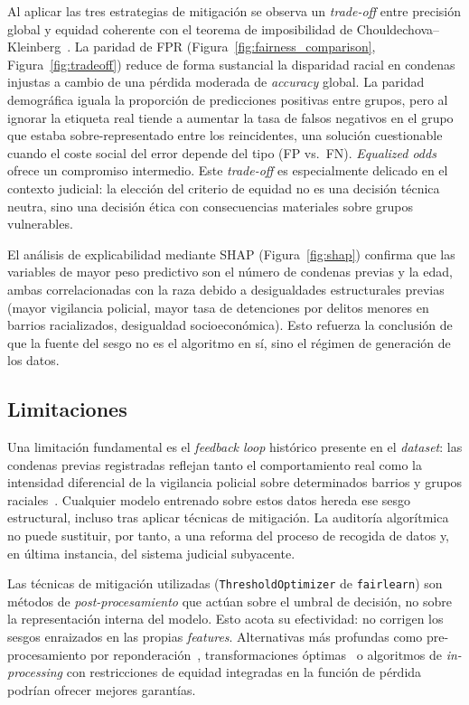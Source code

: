 \documentclass[11pt,a4paper]{article}
\begin{document}
Al aplicar las tres estrategias de mitigación se observa un \textit{trade-off} entre precisión global y equidad coherente con el teorema de imposibilidad de Chouldechova--Kleinberg~\cite{chouldechova2017fair, kleinberg2017inherent}. La paridad de FPR (Figura~\ref{fig:fairness_comparison}, Figura~\ref{fig:tradeoff}) reduce de forma sustancial la disparidad racial en condenas injustas a cambio de una pérdida moderada de \textit{accuracy} global. La paridad demográfica iguala la proporción de predicciones positivas entre grupos, pero al ignorar la etiqueta real tiende a aumentar la tasa de falsos negativos en el grupo que estaba sobre-representado entre los reincidentes, una solución cuestionable cuando el coste social del error depende del tipo (FP vs.\ FN). \textit{Equalized odds} ofrece un compromiso intermedio. Este \textit{trade-off} es especialmente delicado en el contexto judicial: la elección del criterio de equidad no es una decisión técnica neutra, sino una decisión ética con consecuencias materiales sobre grupos vulnerables.

El análisis de explicabilidad mediante SHAP (Figura~\ref{fig:shap}) confirma que las variables de mayor peso predictivo son el número de condenas previas y la edad, ambas correlacionadas con la raza debido a desigualdades estructurales previas (mayor vigilancia policial, mayor tasa de detenciones por delitos menores en barrios racializados, desigualdad socioeconómica). Esto refuerza la conclusión de que la fuente del sesgo no es el algoritmo en sí, sino el régimen de generación de los datos.

\subsection{Limitaciones}

Una limitación fundamental es el \textit{feedback loop} histórico presente en el \textit{dataset}: las condenas previas registradas reflejan tanto el comportamiento real como la intensidad diferencial de la vigilancia policial sobre determinados barrios y grupos raciales~\cite{angwin2016machine, barocas2019fairness}. Cualquier modelo entrenado sobre estos datos hereda ese sesgo estructural, incluso tras aplicar técnicas de mitigación. La auditoría algorítmica no puede sustituir, por tanto, a una reforma del proceso de recogida de datos y, en última instancia, del sistema judicial subyacente.

Las técnicas de mitigación utilizadas (\texttt{ThresholdOptimizer} de \texttt{fairlearn}) son métodos de \emph{post-procesamiento} que actúan sobre el umbral de decisión, no sobre la representación interna del modelo. Esto acota su efectividad: no corrigen los sesgos enraizados en las propias \textit{features}. Alternativas más profundas como pre-procesamiento por reponderación~\cite{kamiran2012data}, transformaciones óptimas~\cite{calmon2017optimized} o algoritmos de \textit{in-processing} con restricciones de equidad integradas en la función de pérdida~\cite{agarwal2018reductions, zafar2017fairness} podrían ofrecer mejores garantías.
\end{document}
